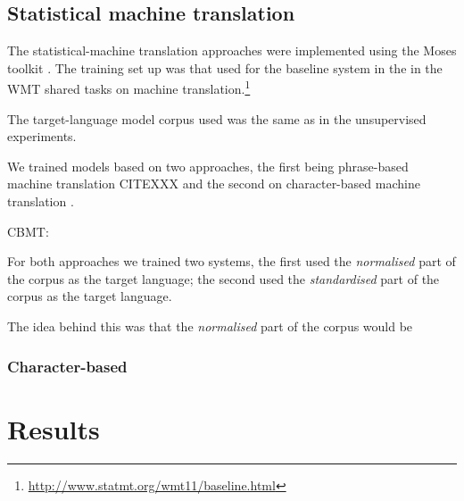 \documentclass[11pt]{article}
\begin{document}
%

\subsection{Statistical machine translation}


The statistical-machine translation approaches were implemented using the 
Moses toolkit \cite{koehn2007}. The training set up was that used for
the baseline system in the  in the WMT shared tasks
on machine translation.\footnote{\url{http://www.statmt.org/wmt11/baseline.html}}

The target-language model corpus used was the same as in the unsupervised experiments. 

We trained models based on two approaches, the first being phrase-based machine translation
CITEXXX and the second on character-based machine translation \cite{nakov2012}.

CBMT: \cite{TiedemannEAMT2009, TiedemannEACL2012}

For both approaches we trained two systems, the first used the \emph{normalised}
part of the corpus as the target language; the second used the \emph{standardised} 
part of the corpus as the target language.

The idea behind this was that the \emph{normalised} part of the corpus would be 

\subsubsection{Character-based}


\section{Results}
\end{document}
